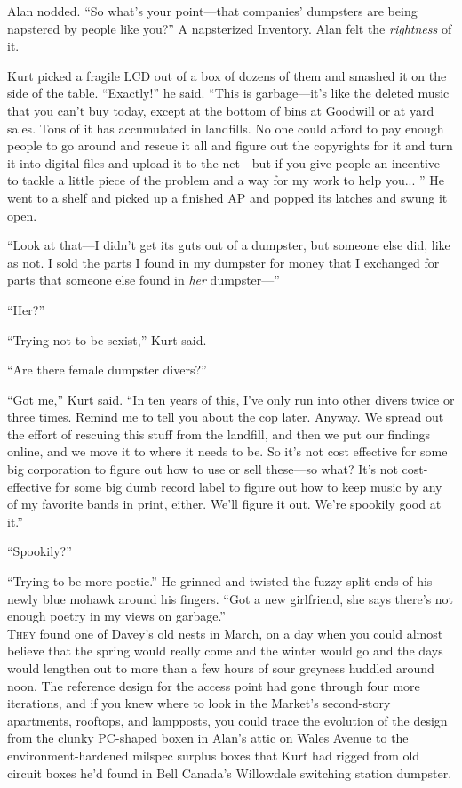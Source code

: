 Alan nodded.  ``So what's your point---that companies' dumpsters are
being napstered by people like you?'' A napsterized Inventory.  Alan
felt the \textit{rightness} of it.

Kurt picked a fragile LCD out of a box of dozens of them and smashed
it on the side of the table.  ``Exactly!'' he said.  ``This is
garbage---it's like the deleted music that you can't buy today, except
at the bottom of bins at Goodwill or at yard sales.  Tons of it has
accumulated in landfills.  No one could afford to pay enough people to
go around and rescue it all and figure out the copyrights for it and
turn it into digital files and upload it to the net---but if you give
people an incentive to tackle a little piece of the problem and a way
for my work to help you...  '' He went to a shelf and picked up a
finished AP and popped its latches and swung it open.

``Look at that---I didn't get its guts out of a dumpster, but someone
else did, like as not.  I sold the parts I found in my dumpster for
money that I exchanged for parts that someone else found in
\textit{her} dumpster---''

``Her?''

``Trying not to be sexist,'' Kurt said.

``Are there female dumpster divers?''

``Got me,'' Kurt said.  ``In ten years of this, I've only run into
other divers twice or three times.  Remind me to tell you about the
cop later.  Anyway.  We spread out the effort of rescuing this stuff
from the landfill, and then we put our findings online, and we move it
to where it needs to be.  So it's not cost effective for some big
corporation to figure out how to use or sell these---so what?  It's
not cost-effective for some big dumb record label to figure out how to
keep music by any of my favorite bands in print, either.  We'll figure
it out.  We're spookily good at it.''

``Spookily?''

``Trying to be more poetic.'' He grinned and twisted the fuzzy split
ends of his newly blue mohawk around his fingers.  ``Got a new
girlfriend, she says there's not enough poetry in my views on
garbage.''
\\
\lettrine[lines=3, lhang=.5, nindent=0pt, findent=2pt]{T}{hey} found one of Davey's old nests in March, on a day when you could
almost believe that the spring would really come and the winter would
go and the days would lengthen out to more than a few hours of sour
greyness huddled around noon.  The reference design for the access
point had gone through four more iterations, and if you knew where to
look in the Market's second-story apartments, rooftops, and lampposts,
you could trace the evolution of the design from the clunky PC-shaped
boxen in Alan's attic on Wales Avenue to the environment-hardened
milspec surplus boxes that Kurt had rigged from old circuit boxes he'd
found in Bell Canada's Willowdale switching station dumpster.

